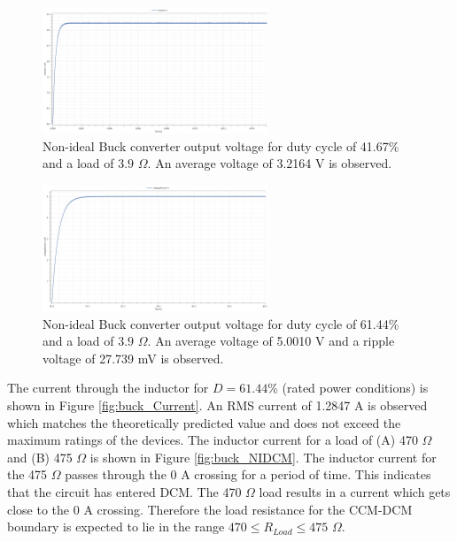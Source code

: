 \documentclass[12pt,twoside]{scrartcl}
\begin{document}
\begin{figure}[h]
    \centering
    \includegraphics[width=0.6\textwidth]{buck_NI_output_oldD}
    \caption{Non-ideal Buck converter output voltage for duty cycle of 41.67\% and a load of $3.9$ $\Omega$. An average voltage of 3.2164 V is observed.}
    \label{fig:buck_NI_output_oldD}
\end{figure}
\begin{figure}[h]
    \centering
    \includegraphics[width=0.6\textwidth]{buck_NI_output_newD}
    \caption{Non-ideal Buck converter output voltage for duty cycle of 61.44\% and a load of $3.9$ $\Omega$. An average voltage of 5.0010 V and a ripple voltage of 27.739 mV is observed.}
    \label{fig:buck_NI_output_newD}
\end{figure}
\pagebreak

\noindent The current through the inductor for $D = 61.44$\% (rated power conditions) is shown in Figure \ref{fig:buck_Current}. An RMS current of 1.2847 A is observed which matches the theoretically predicted value and does not exceed the maximum ratings of the devices. The inductor current for a load of (A) 470 $\Omega$ and (B) 475 $\Omega$ is shown in Figure \ref{fig:buck_NIDCM}. The inductor current for the 475 $\Omega$ passes through the 0 A crossing for a period of time. This indicates that the circuit has entered DCM. The 470 $\Omega$ load results in a current which gets close to the 0 A crossing. Therefore the load resistance for the CCM-DCM boundary is expected to lie in the range $470 \le R_{Load} \le 475$ $\Omega$. \par
\newpage
\end{document}

